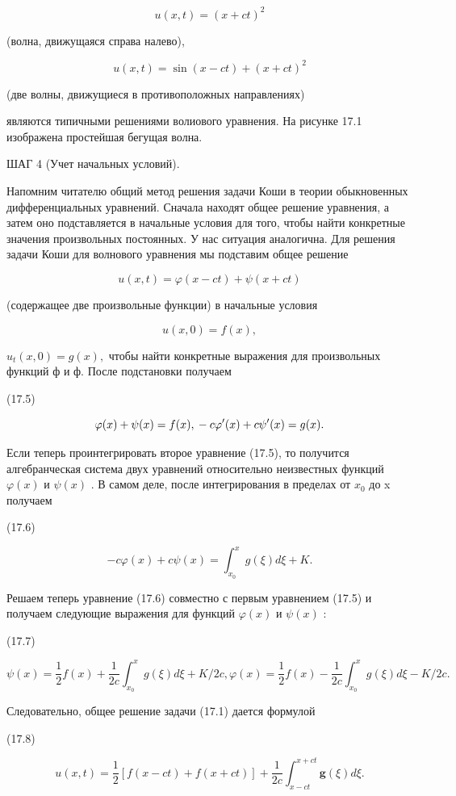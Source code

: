 \documentclass[
  ukrainian,
]{article}
\begin{document}
\[
u(x, t) = (x + ct)^2
\]

(волна, движущаяся справа налево),

\[
u(x, t) = \sin(x - ct) + (x + ct)^2
\]

(две волны, движущиеся в противоположных направлениях)

являются типичными решениями волиового уравнения. На рисунке 17.1
изображена простейшая бегущая волна.

ШАГ 4 (Учет начальных условий).

Напомним читателю общий метод решения задачи Коши в теории обыкновенных
дифференциальных уравнений. Сначала находят общее решение уравнения, а
затем оно подставляется в начальные условия для того, чтобы найти
конкретные значения произвольных постоянных. У нас ситуация аналогична.
Для решения задачи Коши для волнового уравнения мы подставим общее
решение

\[
u(x, t) = \varphi(x - ct) + \psi(x + ct)
\]

(содержащее две произвольные функции) в начальные условия

\[
u(x, 0) = f(x),
\]

\(u_t(x, 0) = g(x),\) чтобы найти конкретные выражения для произвольных
функций ф и ф. После подстановки получаем

(17.5)

\[
\varphi(x) + \psi(x) = f(x), \\ -c\varphi'(x) + c\psi'(x) = g(x).
\]

Если теперь проинтегрировать второе уравнение (17.5), то получится
алгебранческая система двух уравнений относительно неизвестных функций
\(\varphi(x)\) и \(\psi(x)\) . В самом деле, после интегрирования в
пределах от \(x_0\) до x получаем

(17.6)

\[
-c\varphi(x) + c\psi(x) = \int_{x_0}^{x} g(\xi) d\xi + K.
\]

Решаем теперь уравнение (17.6) совместно с первым уравнением (17.5) и
получаем следующие выражения для функций \(\varphi(x)\) и \(\psi(x)\) :

(17.7)

\[
\psi(x) = \frac{1}{2} f(x) + \frac{1}{2c} \int_{x_0}^{x} g(\xi) d\xi + K/2c,
\varphi(x) = \frac{1}{2} f(x) - \frac{1}{2c} \int_{x_0}^{x} g(\xi) d\xi - K/2c.
\]

Следовательно, общее решение задачи (17.1) дается формулой

(17.8)

\[
u(x, t) = \frac{1}{2} \left[ f(x-ct) + f(x+ct) \right] + \frac{1}{2c} \int_{x-ct}^{x+ct} \mathbf{g}(\xi) d\xi.
\]
\end{document}
